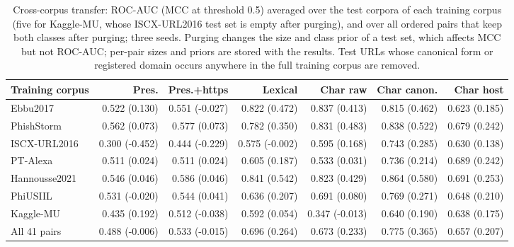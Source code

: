 \begin{table}[tp]
\centering
\caption{Cross-corpus transfer: ROC-AUC (MCC at threshold 0.5) averaged over the test corpora of each training corpus (five for Kaggle-MU, whose ISCX-URL2016 test set is empty after purging), and over all ordered pairs that keep both classes after purging; three seeds. Purging changes the size and class prior of a test set, which affects MCC but not ROC-AUC; per-pair sizes and priors are stored with the results. Test URLs whose canonical form or registered domain occurs anywhere in the full training corpus are removed.}
\label{tab:pair_domain}
\footnotesize
\begin{adjustbox}{max width=\linewidth}
\begin{tabular}{@{}lrrrrrr@{}}
\toprule
Training corpus & Pres. & Pres.+https & Lexical & Char raw & Char canon. & Char host \\
\midrule
Ebbu2017 & 0.522 (0.130) & 0.551 (-0.027) & 0.822 (0.472) & 0.837 (0.413) & 0.815 (0.462) & 0.623 (0.185) \\
PhishStorm & 0.562 (0.073) & 0.577 (0.073) & 0.782 (0.350) & 0.831 (0.483) & 0.838 (0.522) & 0.679 (0.242) \\
ISCX-URL2016 & 0.300 (-0.452) & 0.444 (-0.229) & 0.575 (-0.002) & 0.595 (0.168) & 0.743 (0.285) & 0.630 (0.138) \\
PT-Alexa & 0.511 (0.024) & 0.511 (0.024) & 0.605 (0.187) & 0.533 (0.031) & 0.736 (0.214) & 0.689 (0.242) \\
Hannousse2021 & 0.546 (0.046) & 0.586 (0.046) & 0.841 (0.542) & 0.823 (0.429) & 0.864 (0.580) & 0.691 (0.253) \\
PhiUSIIL & 0.531 (-0.020) & 0.544 (0.041) & 0.636 (0.207) & 0.691 (0.080) & 0.769 (0.271) & 0.648 (0.210) \\
Kaggle-MU & 0.435 (0.192) & 0.512 (-0.038) & 0.592 (0.054) & 0.347 (-0.013) & 0.640 (0.190) & 0.638 (0.175) \\
\midrule
All 41 pairs & 0.488 (-0.006) & 0.533 (-0.015) & 0.696 (0.264) & 0.673 (0.233) & 0.775 (0.365) & 0.657 (0.207) \\
\bottomrule
\end{tabular}
\end{adjustbox}
\end{table}
